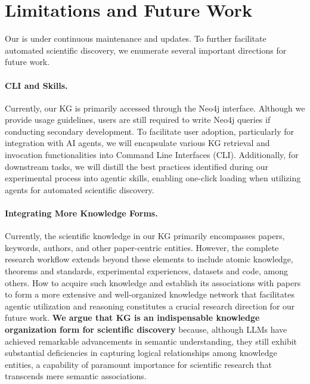 \section{Limitations and Future Work}
Our {\ours} is under continuous maintenance and updates.
To further facilitate automated scientific discovery, we enumerate several important directions for future work.

\paragraph{CLI and Skills.}
Currently, our KG is primarily accessed through the Neo4j interface.
Although we provide usage guidelines, users are still required to write Neo4j queries if conducting secondary development.
To facilitate user adoption, particularly for integration with AI agents, we will encapsulate various KG retrieval and invocation functionalities into Command Line Interfaces (CLI).
 Additionally, for downstream tasks, we will distill the best practices identified during our experimental process into agentic skills, enabling one-click loading when utilizing agents for automated scientific discovery.

\paragraph{Integrating More Knowledge Forms.}
Currently, the scientific knowledge in our KG primarily encompasses papers, keywords, authors, and other paper-centric entities.
However, the complete research workflow extends beyond these elements to include atomic knowledge, theorems and standards, experimental experiences, datasets and code, among others.
How to acquire such knowledge and establish its associations with papers to form a more extensive and well-organized knowledge network that facilitates agentic utilization and reasoning constitutes a crucial research direction for our future work.
\textbf{We argue that KG is an indispensable knowledge organization form for scientific discovery} because, although LLMs have achieved remarkable advancements in semantic understanding, they still exhibit substantial deficiencies in capturing logical relationships among knowledge entities, a capability of paramount importance for scientific research that transcends mere semantic associations.

